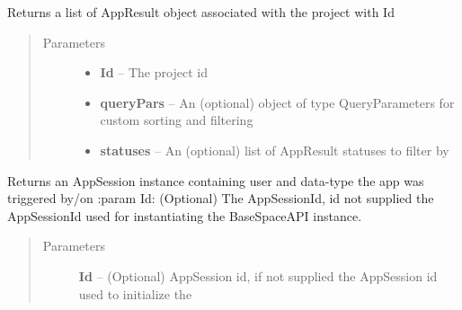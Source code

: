 \documentclass[letterpaper,10pt,english]{sphinxmanual}
\begin{document}
\begin{fulllineitems}

\begin{fulllineitems}
\label{Available modules:BaseSpacePy.api.BaseSpaceAPI.BaseSpaceAPI.getAppResultsByProject}
Returns a list of AppResult object associated with the project with Id
\begin{quote}\begin{description}
\item[{Parameters}] \leavevmode\begin{itemize}
\item {} 
\textbf{Id} -- The project id

\item {} 
\textbf{queryPars} -- An (optional) object of type QueryParameters for custom sorting and filtering

\item {} 
\textbf{statuses} -- An (optional) list of AppResult statuses to filter by

\end{itemize}

\end{description}\end{quote}

\end{fulllineitems}


\begin{fulllineitems}
\label{Available modules:BaseSpacePy.api.BaseSpaceAPI.BaseSpaceAPI.getAppSession}
Returns an AppSession instance containing user and data-type the app was triggered by/on 
:param Id: (Optional) The AppSessionId, id not supplied the AppSessionId used for instantiating
the BaseSpaceAPI instance.
\begin{quote}\begin{description}
\item[{Parameters}] \leavevmode
\textbf{Id} -- (Optional) AppSession id, if not supplied the AppSession id used to initialize the

\end{description}\end{quote}


\end{fulllineitems}
\end{fulllineitems}
\end{document}
